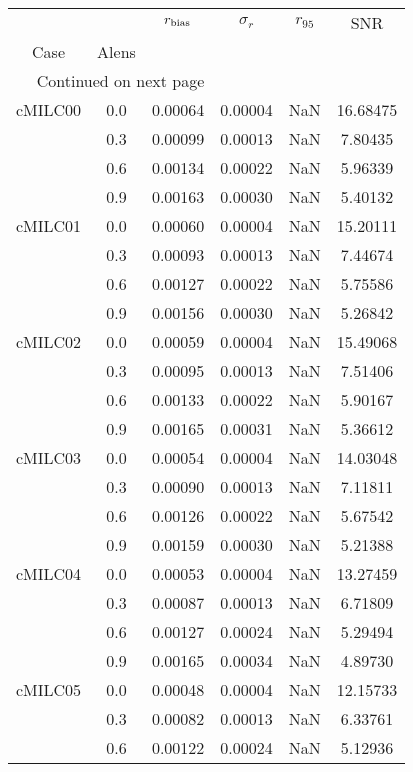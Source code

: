 \begin{longtable}{cccccc}
\toprule
        &     &  $r_{\rm bias}$  &  $\sigma_r$ &  $r_{95}$ &      SNR \\
Case & Alens &                  &             &           &          \\
\midrule
\endhead
\midrule
\multicolumn{3}{r}{{Continued on next page}} \\
\midrule
\endfoot

\bottomrule
\endlastfoot
cMILC00 & 0.0 & 0.00064 & 0.00004 & NaN & 16.68475 \\
        & 0.3 & 0.00099 & 0.00013 & NaN & 7.80435 \\
        & 0.6 & 0.00134 & 0.00022 & NaN & 5.96339 \\
        & 0.9 & 0.00163 & 0.00030 & NaN & 5.40132 \\
cMILC01 & 0.0 & 0.00060 & 0.00004 & NaN & 15.20111 \\
        & 0.3 & 0.00093 & 0.00013 & NaN & 7.44674 \\
        & 0.6 & 0.00127 & 0.00022 & NaN & 5.75586 \\
        & 0.9 & 0.00156 & 0.00030 & NaN & 5.26842 \\
cMILC02 & 0.0 & 0.00059 & 0.00004 & NaN & 15.49068 \\
        & 0.3 & 0.00095 & 0.00013 & NaN & 7.51406 \\
        & 0.6 & 0.00133 & 0.00022 & NaN & 5.90167 \\
        & 0.9 & 0.00165 & 0.00031 & NaN & 5.36612 \\
cMILC03 & 0.0 & 0.00054 & 0.00004 & NaN & 14.03048 \\
        & 0.3 & 0.00090 & 0.00013 & NaN & 7.11811 \\
        & 0.6 & 0.00126 & 0.00022 & NaN & 5.67542 \\
        & 0.9 & 0.00159 & 0.00030 & NaN & 5.21388 \\
cMILC04 & 0.0 & 0.00053 & 0.00004 & NaN & 13.27459 \\
        & 0.3 & 0.00087 & 0.00013 & NaN & 6.71809 \\
        & 0.6 & 0.00127 & 0.00024 & NaN & 5.29494 \\
        & 0.9 & 0.00165 & 0.00034 & NaN & 4.89730 \\
cMILC05 & 0.0 & 0.00048 & 0.00004 & NaN & 12.15733 \\
        & 0.3 & 0.00082 & 0.00013 & NaN & 6.33761 \\
        & 0.6 & 0.00122 & 0.00024 & NaN & 5.12936 \\

\end{longtable}
